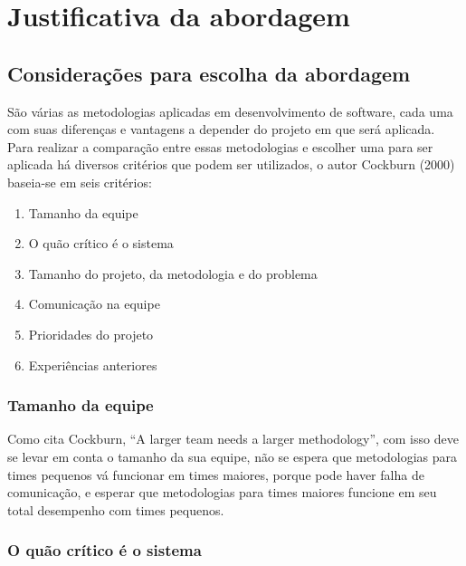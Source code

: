 \chapter{Justificativa da abordagem}

\section{Considerações para escolha da abordagem}

São várias as metodologias aplicadas em desenvolvimento de software, cada uma com suas diferenças e vantagens a depender do projeto em que será aplicada.
\nocite{cockburn} Para realizar a comparação entre essas metodologias e escolher uma para ser aplicada há diversos critérios que podem ser utilizados, o autor Cockburn (2000) baseia-se em seis critérios: 
\begin{enumerate}       
\item Tamanho da equipe
\item O quão crítico é o sistema
\item Tamanho do projeto, da metodologia e do problema
\item Comunicação na equipe
\item Prioridades do projeto
\item Experiências anteriores
\end{enumerate}
    
\subsection{Tamanho da equipe}

    Como cita Cockburn, “A larger team needs a larger methodology”, com isso deve se levar em conta o tamanho da sua equipe, não se espera que metodologias para times pequenos vá funcionar em times maiores, porque pode haver falha de comunicação, e esperar que metodologias para times maiores funcione em seu total desempenho com times pequenos.

\subsection{O quão crítico é o sistema}

